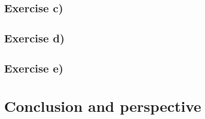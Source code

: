 \documentclass{article}
\begin{document}
  \subsection{Exercise c)} \label{sec:Results c)}

  \subsection{Exercise d)} \label{sec:Results d)}




  \subsection{Exercise e)} \label{sec:Results e)}

\vspace{1cm}

\section{Conclusion and perspective} \label{sec:Conclusion}
\end{document}
